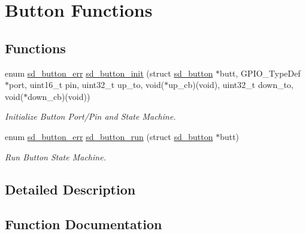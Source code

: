 \hypertarget{group___s_d___button___functions}{}\section{Button Functions}
\label{group___s_d___button___functions}
\subsection*{Functions}
\begin{DoxyCompactItemize}
\item 
enum \mbox{\hyperlink{group___s_d___button___types_ga93131f1a3e8fe4f740d62e8ac62685e8}{sd\+\_\+button\+\_\+err}} \mbox{\hyperlink{group___s_d___button___functions_gafbd98b246aac98e61d371b0317da9556}{sd\+\_\+button\+\_\+init}} (struct \mbox{\hyperlink{structsd__button}{sd\+\_\+button}} $\ast$butt, G\+P\+I\+O\+\_\+\+Type\+Def $\ast$port, uint16\+\_\+t pin, uint32\+\_\+t up\+\_\+to, void($\ast$up\+\_\+cb)(void), uint32\+\_\+t down\+\_\+to, void($\ast$down\+\_\+cb)(void))
\begin{DoxyCompactList}\small\item\em Initialize Button Port/\+Pin and State Machine. \end{DoxyCompactList}\item 
enum \mbox{\hyperlink{group___s_d___button___types_ga93131f1a3e8fe4f740d62e8ac62685e8}{sd\+\_\+button\+\_\+err}} \mbox{\hyperlink{group___s_d___button___functions_ga7a7531af5b22def563a84f74d8328aa8}{sd\+\_\+button\+\_\+run}} (struct \mbox{\hyperlink{structsd__button}{sd\+\_\+button}} $\ast$butt)
\begin{DoxyCompactList}\small\item\em Run Button State Machine. \end{DoxyCompactList}\end{DoxyCompactItemize}


\subsection{Detailed Description}


\subsection{Function Documentation}
\mbox{\label{group___s_d___button___functions_gafbd98b246aac98e61d371b0317da9556}} 
